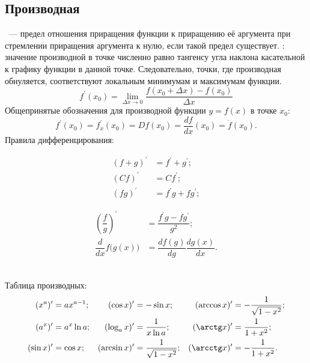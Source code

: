 \subsection{Производная}
~--- предел отношения приращения функции к приращению её аргумента при стремлении приращения аргумента к нулю, если такой предел существует. : значение производной в точке численно равно тангенсу угла наклона касательной к графику функции в данной точке. Следовательно, точки, где производная обнуляется, соответствуют локальным минимумам и максимумам функции.
\begin{equation}
f^\prime(x_0) = \lim_{\Delta x \to 0}\frac{f(x_0 + \Delta x) - f(x_0)}{\Delta x}
\end{equation}
Общепринятые обозначения для производной функции $y = f(x)$ в точке $x_0$:
\begin{equation}
f^\prime(x_0) = f^\prime_x(x_0) = D f(x_0) = \frac{d f}{d x}(x_0) = \dot{f} (x_0).
\end{equation}
Правила дифференцирования:\\[-0.5pc]
\begin{minipage}{0.5\textwidth}
\begin{align*}
(f+g)^\prime &= f^\prime + g^\prime;\\
(Cf)^\prime &= Cf^\prime;\\
(fg)^\prime &= f^\prime g + f g^\prime;
\end{align*}
\end{minipage}
\begin{minipage}{0.5\textwidth}
\begin{align*}
\left(\dfrac{f}{g}\right)^\prime &= \dfrac{f^\prime g - f g^\prime}{g^2};\\
\dfrac{d}{dx}f\bigl(g(x)\bigr) &= \dfrac{df(g)}{dg}\dfrac{dg(x)}{dx}.
\end{align*}
\end{minipage}\\[0.5pc]
Таблица производных:
\begin{align*} 
(x^a)^\prime &= a x^{a-1};
& (\cos x)^\prime &= - \sin x;
& (\arccos x)^\prime &= - \dfrac{1}{\sqrt{1 - x^2}};\\
(a^x)^\prime &= a^x \ln a;
& (\log_a x)^\prime &= \dfrac{1}{x \ln a}; 
& (\arctg x)^\prime &= \dfrac{1}{1 + x^2};\\
(\sin x)^\prime &= \cos x; 
& (\arcsin x)^\prime &= 
\dfrac{1}{\sqrt{1 - x^2}};
&  (\arcctg x)^\prime &= - \dfrac{1}{1 + x^2}.
\end{align*}